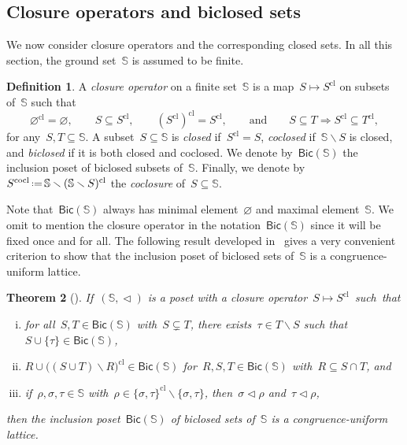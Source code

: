\documentclass{amsart}
\newtheorem{theorem}{Theorem}[part]
\theoremstyle{definition}
\newtheorem{definition}[theorem]{Definition}
\newcommand{\cS}{\mathbb{S}} %
\newcommand{\ssm}{\smallsetminus} %
\newcommand{\eqdef}{\mbox{\,\raisebox{0.2ex}{\scriptsize\ensuremath{\mathrm:}}\ensuremath{=}\,}} %
\newcommand{\darkblue}{\color{darkblue}} %
\newcommand{\defn}[1]{\textsl{\darkblue #1}} %
\newcommand{\closure}[1]{#1^{\mathrm{cl}}} %
\newcommand{\coclosure}[1]{#1^{\mathrm{cocl}}} %
\newcommand{\Bicl}[1]{\mathsf{Bic}(#1)} %
\begin{document}
\subsection{Closure operators and biclosed sets}

We now consider closure operators and the corresponding closed sets. In all this section, the ground set~$\cS$ is assumed to be finite.

\begin{definition}
\label{def:closureOperator}
A \defn{closure operator} on a finite set~$\cS$ is a map~$S \mapsto \closure{S}$ on subsets of~$\cS$ such that
\[
\closure{\varnothing} = \varnothing,
\qquad
S \subseteq \closure{S},
\qquad
\closure{(\closure{S})} = \closure{S},
\qquad\text{and}\qquad
S \subseteq T \Longrightarrow \closure{S} \subseteq \closure{T},
\]
for any~$S,T \subseteq \cS$.
A subset~$S \subseteq \cS$ is \defn{closed} if~$\closure{S} = S$, \defn{coclosed} if~$\cS \ssm S$ is closed, and \defn{biclosed} if it is both closed and coclosed.
We denote by~$\Bicl{\cS}$ the inclusion poset of biclosed subsets of~$\cS$.
Finally, we denote by~$\coclosure{S} \eqdef \cS \ssm \closure{(\cS \ssm S)}$ the \defn{coclosure} of~$S \subseteq \cS$.
\end{definition}

Note that~$\Bicl{\cS}$ always has minimal element~$\varnothing$ and maximal element~$\cS$.
We omit to mention the closure operator in the notation~$\Bicl{\cS}$ since it will be fixed once and for all.
The following result developed in~\cite[Sect.~5]{McConville} gives a very convenient criterion to show that the inclusion poset of biclosed sets of~$\cS$ is a congruence-uniform lattice.

\begin{theorem}[{\cite[Thm.~5.5]{McConville}}]
\label{thm:characterizationCongruenceUniform}
If~$(\cS, \vartriangleleft)$ is a poset with a closure operator~$S \mapsto \closure{S}$~such~that
\begin{enumerate}[(i)]
\item for all~$S,T \in \Bicl{\cS}$ with~$S \subsetneq T$, there exists~$\tau \in T \ssm S$ such that~$S \cup \{\tau\} \in \Bicl{\cS}$, %
\item $R \cup \closure{\big((S \cup T) \ssm R\big)} \in \Bicl{\cS}$ for~$R,S,T \in \Bicl{\cS}$ with~$R \subseteq S \cap T$, and
\item if~$\rho,\sigma,\tau \in \cS$ with~$\rho \in \closure{\{\sigma,\tau\}} \ssm \{\sigma,\tau\}$, then~$\sigma \vartriangleleft \rho$ and~$\tau \vartriangleleft \rho$,
\end{enumerate}
then the inclusion poset~$\Bicl{\cS}$ of biclosed sets of~$\cS$ is a congruence-uniform lattice.
\end{theorem}
\end{document}
